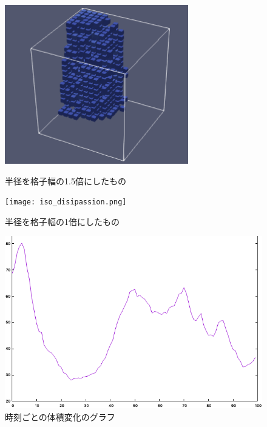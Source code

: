 \documentclass[a4j,12pt]{jreport}
\begin{document}
\begin{figure}[H]
  \begin{minipage}[b]{0.5\linewidth}
    \centering
        \includegraphics[width=80mm]{disipassion.png}
    \caption{半径を格子幅の1.5倍にしたもの}
    \label{fig:ParaView1}
  \end{minipage}
  \begin{minipage}[b]{0.45\linewidth}
    \centering
        \texttt{[image: iso\_disipassion.png]}
    \caption{半径を格子幅の1倍にしたもの}
    \label{fig:ParaView2}
  \end{minipage}
  \begin{minipage}[b]{0.5\linewidth}
    \centering
    \includegraphics[width=170mm]{graph.png}
    \caption{時刻ごとの体積変化のグラフ}
     \label{fig:graph}
  \end{minipage}

\end{figure}
\end{document}
